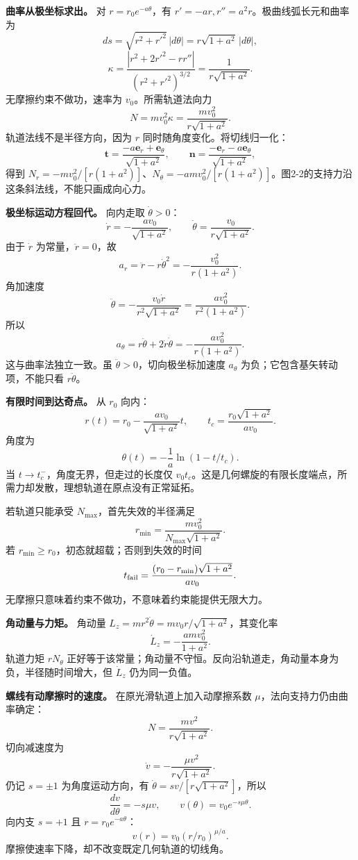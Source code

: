 \documentclass[12pt,a4paper,UTF8]{ctexart}
\begin{document}
\textbf{曲率从极坐标求出。} 对 \(r=r_0e^{-a\theta}\)，有
\(r'=-ar,r''=a^2r\)。极曲线弧长元和曲率为 \[
ds=\sqrt{r^2+r'^2}\,|d\theta|
=r\sqrt{1+a^2}\,|d\theta|,
\] \[
\kappa=\frac{|r^2+2r'^2-rr''|}
{(r^2+r'^2)^{3/2}}
=\frac1{r\sqrt{1+a^2}}.
\] 无摩擦约束不做功，速率为 \(v_0\)。所需轨道法向力 \[
N=mv_0^2\kappa=\frac{mv_0^2}{r\sqrt{1+a^2}}.
\] 轨道法线不是半径方向，因为 \(r\) 同时随角度变化。将切线归一化： \[
\boldsymbol t=\frac{-a\boldsymbol e_r+\boldsymbol e_\theta}{\sqrt{1+a^2}},
\qquad
\boldsymbol n=\frac{-\boldsymbol e_r-a\boldsymbol e_\theta}{\sqrt{1+a^2}},
\] 得到
\(N_r=-mv_0^2/[r(1+a^2)]\)、\(N_\theta=-amv_0^2/[r(1+a^2)]\)。图2-2的支持力沿这条斜法线，不能只画成向心力。

\textbf{极坐标运动方程回代。} 向内走取 \(\dot\theta>0\)： \[
\dot r=-\frac{av_0}{\sqrt{1+a^2}},\qquad
\dot\theta=\frac{v_0}{r\sqrt{1+a^2}}.
\] 由于 \(\dot r\) 为常量，\(\ddot r=0\)，故 \[
a_r=\ddot r-r\dot\theta^2
=-\frac{v_0^2}{r(1+a^2)}.
\] 角加速度 \[
\ddot\theta=-\frac{v_0\dot r}{r^2\sqrt{1+a^2}}
=\frac{av_0^2}{r^2(1+a^2)}.
\] 所以 \[
a_\theta=r\ddot\theta+2\dot r\dot\theta
=-\frac{av_0^2}{r(1+a^2)}.
\] 这与曲率法独立一致。虽 \(\ddot\theta>0\)，切向极坐标加速度
\(a_\theta\) 为负；它包含基矢转动项，不能只看 \(r\ddot\theta\)。

\textbf{有限时间到达奇点。} 从 \(r_0\) 向内： \[
r(t)=r_0-\frac{av_0}{\sqrt{1+a^2}}t,\qquad
t_c=\frac{r_0\sqrt{1+a^2}}{av_0}.
\] 角度为 \[
\theta(t)=-\frac1a\ln(1-t/t_c).
\] 当 \(t\to t_c^-\)，角度无界，但走过的长度仅
\(v_0t_c\)。这是几何螺旋的有限长度端点，所需力却发散，理想轨道在原点没有正常延拓。

若轨道只能承受 \(N_{\max}\)，首先失效的半径满足 \[
r_{\min}=\frac{mv_0^2}{N_{\max}\sqrt{1+a^2}}.
\] 若 \(r_{\min}\ge r_0\)，初态就超载；否则到失效的时间 \[
t_{\rm fail}=\frac{(r_0-r_{\min})\sqrt{1+a^2}}{av_0}.
\] 无摩擦只意味着约束不做功，不意味着约束能提供无限大力。

\textbf{角动量与力矩。} 角动量
\(L_z=mr^2\dot\theta=mv_0r/\sqrt{1+a^2}\)，其变化率 \[
\dot L_z=-\frac{amv_0^2}{1+a^2}.
\] 轨道力矩 \(rN_\theta\)
正好等于该常量；角动量不守恒。反向沿轨道走，角动量本身为负，半径随时间增大，但
\(\dot L_z\) 仍为同一负值。

\textbf{螺线有动摩擦时的速度。} 在原光滑轨道上加入动摩擦系数
\(\mu\)，法向支持力仍由曲率确定： \[
N=\frac{mv^2}{r\sqrt{1+a^2}}.
\] 切向减速度为 \[
\dot v=-\frac{\mu v^2}{r\sqrt{1+a^2}}.
\] 仍记 \(s=\pm1\) 为角度运动方向，有
\(\dot\theta=sv/[r\sqrt{1+a^2}]\)，所以 \[
\frac{dv}{d\theta}=-s\mu v,\qquad
\boxed{v(\theta)=v_0e^{-s\mu\theta}}.
\] 向内支 \(s=+1\) 且 \(r=r_0e^{-a\theta}\)： \[
v(r)=v_0(r/r_0)^{\mu/a}.
\] 摩擦使速率下降，却不改变既定几何轨道的切线角。
\end{document}
